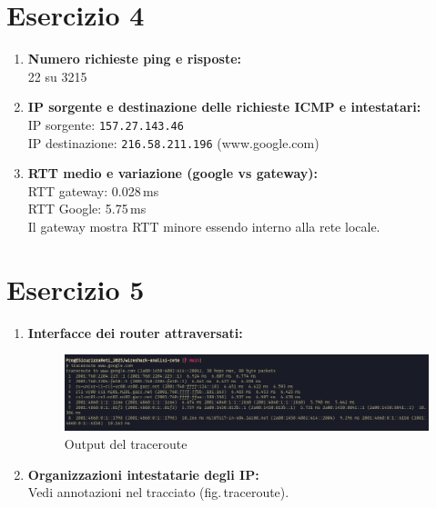 \documentclass[a4paper,12pt]{article}
\begin{document}
\section*{Esercizio 4}
\begin{enumerate}
  \item \textbf{Numero richieste ping e risposte:}\\
    22 su 3215
  \item \textbf{IP sorgente e destinazione delle richieste ICMP e intestatari:}\\
    IP sorgente: \texttt{157.27.143.46} \\
    IP destinazione: \texttt{216.58.211.196} (www.google.com)
  \item \textbf{RTT medio e variazione (google vs gateway):}\\
    RTT gateway: 0.028\,ms \\
    RTT Google: 5.75\,ms \\
    Il gateway mostra RTT minore essendo interno alla rete locale.
\end{enumerate}

\section*{Esercizio 5}
\begin{enumerate}
  \item \textbf{Interfacce dei router attraversati:}\\
    \begin{figure}[h]
      \centering
      \includegraphics[width=0.8\linewidth]{src/traceroute.png}
      \caption{Output del traceroute}
    \end{figure}
  \item \textbf{Organizzazioni intestatarie degli IP:}\\
    Vedi annotazioni nel tracciato (fig.\,traceroute).
\end{enumerate}

\end{document}
